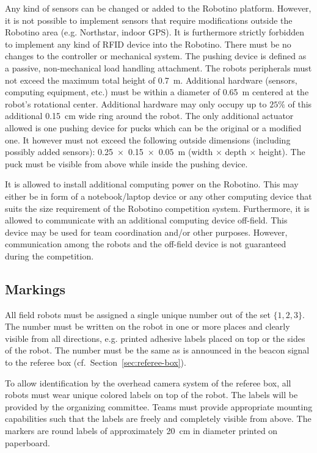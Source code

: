 \documentclass[12pt,twoside]{article}
\newcommand{\Robotino}{Robotino}
\newcommand{\refsec}[1]{Section~\ref{#1}}
\begin{document}
Any kind of sensors can be changed or added to the Robotino platform.
However, it is not possible to implement sensors that require
modifications outside the Robotino area (e.g. Northstar, indoor GPS).
It is furthermore strictly forbidden to implement any kind of RFID
device into the Robotino. There must be no changes to the controller
or mechanical system. The pushing device is defined as a passive,
non-mechanical load handling attachment. The robots peripherals must
not exceed the maximum total height of \SI{0.7}{\metre}. Additional
hardware (sensors, computing equipment, etc.) must be within a
diameter of \SI{0.65}{\metre} centered at the robot's rotational
center. Additional hardware may only occupy up to $25\%$ of this
additional \SI{0.15}{\centi\metre} wide ring around the robot.  The
only additional actuator allowed is one pushing device for pucks which
can be the original or a modified one. It however must not exceed the
following outside dimensions (including possibly added sensors):
\SI{0.25 x 0.15 x 0.05}{\metre} (width $\times$ depth $\times$
height). The puck must be visible from above while inside the pushing
device.

It is allowed to install additional computing power on the
\Robotino. This may either be in form of a notebook/laptop device or
any other computing device that suits the size requirement of the
\Robotino{} competition system. Furthermore, it is allowed to
communicate with an additional computing device off-field. This device
may be used for team coordination and/or other purposes. However,
communication among the robots and the off-field device is not
guaranteed during the competition.

\subsection{Markings}
\label{sec:robot-markings}
All field robots must be assigned a single unique number out of the
set $\{1, 2, 3\}$. The number must be written on the robot in one or
more places and clearly visible from all directions, e.g. printed
adhesive labels placed on top or the sides of the robot. The number
must be the same as is announced in the beacon signal to the referee
box (cf.~\refsec{sec:referee-box}).

To allow identification by the overhead camera system of the referee
box, all robots must wear unique colored labels on top of the
robot. The labels will be provided by the organizing committee. Teams
must provide appropriate mounting capabilities such that the labels
are freely and completely visible from above. The markers are round
labels of approximately \SI{20}{\centi\meter} in diameter printed on
paperboard.
\end{document}
